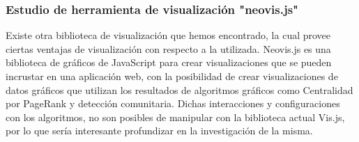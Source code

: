 \subsubsection{Estudio de herramienta de visualización "neovis.js"} Existe otra biblioteca de visualización que hemos encontrado, la cual provee ciertas ventajas de visualización con respecto a la utilizada. Neovis.js es una biblioteca de gráficos de JavaScript para crear visualizaciones que se pueden incrustar en una aplicación web, con la posibilidad de crear visualizaciones de datos gráficos que utilizan los resultados de algoritmos gráficos como Centralidad por PageRank y detección comunitaria. Dichas interacciones y configuraciones con los algoritmos, no son posibles de manipular con la biblioteca actual Vis.js, por lo que sería interesante profundizar en la investigación de la misma. 